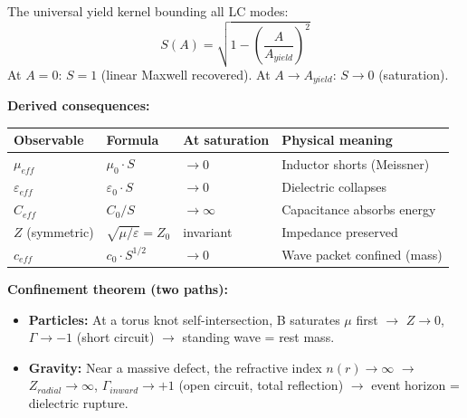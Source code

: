 %
\begin{tcolorbox}[colframe=black!70, colback=gray!5, title=Axiom 4 — Universal Saturation Kernel]
The universal yield kernel bounding all LC modes:
\begin{equation}
    S(A) = \sqrt{1 - \left(\frac{A}{A_{yield}}\right)^{\!2}}
    \label{eq:axiom4_saturation}
\end{equation}
At $A = 0$: $S = 1$ (linear Maxwell recovered).\quad
At $A \to A_{yield}$: $S \to 0$ (saturation).

\medskip
\textbf{Derived consequences:}

\begin{center}\small
\begin{tabular}{llll}
\toprule
\textbf{Observable} & \textbf{Formula} & \textbf{At saturation} & \textbf{Physical meaning} \\
\midrule
$\mu_{eff}$   & $\mu_0 \cdot S$       & $\to 0$       & Inductor shorts (Meissner) \\
$\varepsilon_{eff}$ & $\varepsilon_0 \cdot S$ & $\to 0$     & Dielectric collapses \\
$C_{eff}$     & $C_0 / S$             & $\to \infty$  & Capacitance absorbs energy \\
$Z$ (symmetric) & $\sqrt{\mu/\varepsilon} = Z_0$ & invariant & Impedance preserved \\
$c_{eff}$     & $c_0 \cdot S^{1/2}$  & $\to 0$       & Wave packet confined (mass) \\
\bottomrule
\end{tabular}
\end{center}

\medskip
\textbf{Confinement theorem (two paths):}
\begin{itemize}
    \item \textbf{Particles:} At a torus knot self-intersection,
    B saturates $\mu$ first $\to$ $Z \to 0$, $\Gamma \to -1$
    (short circuit) $\to$ standing wave = rest mass.
    \item \textbf{Gravity:} Near a massive defect, the refractive
    index $n(r) \to \infty$ $\to$ $Z_{radial} \to \infty$,
    $\Gamma_{inward} \to +1$ (open circuit, total reflection)
    $\to$ event horizon = dielectric rupture.
\end{itemize}
\end{tcolorbox}
